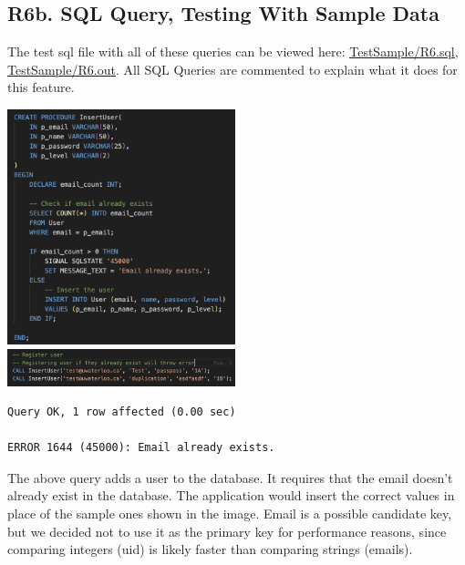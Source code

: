 \documentclass[12pt, a4paper]{article}
\begin{document}
\subsection*{R6b. SQL Query, Testing With Sample Data}
The test sql file with all of these queries can be viewed here: \underline{\href{https://github.com/Kggupta/DegreeMap/tree/main/Database/Queries/TestSample}{TestSample/R6.sql}}, \underline{\href{https://github.com/Kggupta/DegreeMap/tree/main/Database/Queries/TestSample}{TestSample/R6.out}}. All SQL Queries are commented to explain what it does for this feature.

\begin{center}
    \includegraphics[width=250px]{R6/q1}
    \includegraphics[width=250px]{R6/q1_1}
    \begin{verbatim}
Query OK, 1 row affected (0.00 sec)

ERROR 1644 (45000): Email already exists.
    \end{verbatim}
\end{center}
The above query adds a user to the database. It requires that the email doesn't already exist in the database. The application would insert the correct values in place of the sample ones shown in the image. Email is a possible candidate key, but we decided not to use it as the primary key for performance reasons, since comparing integers (uid) is likely faster than comparing strings (emails).
\end{document}
